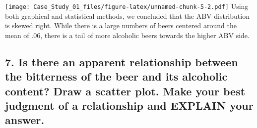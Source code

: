\documentclass[
]{article}
\begin{document}
\texttt{[image: Case\_Study\_01\_files/figure-latex/unnamed-chunk-5-2.pdf]}
Using both graphical and statistical methods, we concluded that the ABV
distribution is skewed right. While there is a large numbers of beers
centered around the mean of .06, there is a tail of more alcoholic beers
towards the higher ABV side.

\hypertarget{is-there-an-apparent-relationship-between-the-bitterness-of-the-beer-and-its-alcoholic-content-draw-a-scatter-plot.-make-your-best-judgment-of-a-relationship-and-explain-your-answer.}{%
\subsection{7. Is there an apparent relationship between the bitterness
of the beer and its alcoholic content? Draw a scatter plot. Make your
best judgment of a relationship and EXPLAIN your
answer.}\label{is-there-an-apparent-relationship-between-the-bitterness-of-the-beer-and-its-alcoholic-content-draw-a-scatter-plot.-make-your-best-judgment-of-a-relationship-and-explain-your-answer.}}
\end{document}
